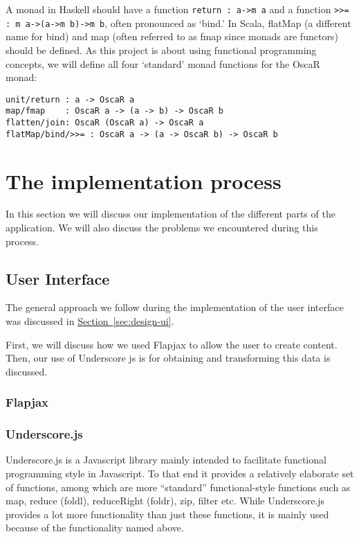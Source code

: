 \documentclass[a4paper]{article}
\begin{document}
A monad in Haskell should have a function \verb|return : a->m a| and a function
 \verb|>>= : m a->(a->m b)->m b|, often pronounced as `bind.'
In Scala, flatMap (a different name for bind) and 
map (often referred to as fmap since monads are functors) should be defined.
As this project is about using functional programming concepts, 
we will define all four `standard' monad functions for the OscaR monad:
\begin{verbatim}
unit/return : a -> OscaR a
map/fmap	: OscaR a -> (a -> b) -> OscaR b
flatten/join: OscaR (OscaR a) -> OscaR a
flatMap/bind/>>= : OscaR a -> (a -> OscaR b) -> OscaR b
\end{verbatim}

\section{The implementation process}
\label{sec:impl}
In this section we will discuss our implementation of the different parts
of the application.
We will also discuss the problems we encountered during this process.

\subsection{User Interface}
The general approach we follow during the implementation of the user interface
was discussed in
\hyperref[sec:design-ui]{Section~\ref*{sec:design-ui}}.

First, we will discuss how we used Flapjax to allow the user to create content.
Then, our use of Underscore js is for obtaining and transforming this data
is discussed.
\subsubsection{Flapjax}


\subsubsection{Underscore.js}

Underscore.js is a Javascript library mainly intended to facilitate
functional programming style in Javascript. To that end it provides a
relatively elaborate set of functions, among which are more
``standard'' functional-style functions such as map, reduce (foldl),
reduceRight (foldr), zip, filter etc. While Underscore.js provides a
lot more functionality than just these functions, it is mainly used
because of the functionality named above.\\
\end{document}
